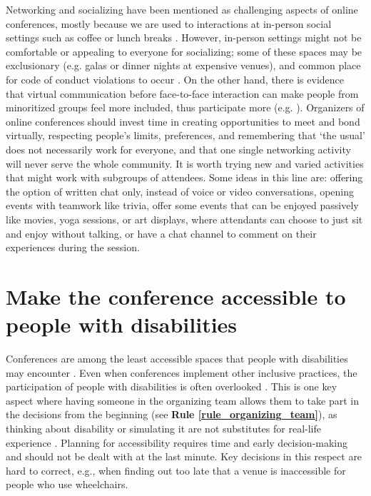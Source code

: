 \documentclass[10pt,letterpaper]{article}
\begin{document}
Networking and socializing have been mentioned as challenging aspects of online conferences, mostly because we are used to interactions at in-person social settings such as coffee or lunch breaks \cite{salibaGettingGripsOnline2020, roosOnlineConferencesNew2020}. 
However, in-person settings might not be comfortable or appealing to everyone for socializing; 
some of these spaces may be exclusionary (e.g. galas or dinner nights at expensive venues), and common place for code of conduct violations to occur \cite{auroraHowRespondCode2019}. 
On the other hand, there is evidence that virtual communication before face-to-face interaction can make people from minoritized groups feel more included, thus participate more (e.g. \cite{trianaDoesOrderFacetoFace2012, blackEngenderingBelongingThoughtful2020}). 
Organizers of online conferences should invest time in creating opportunities to meet and bond virtually, respecting people's limits, preferences, and remembering that `the usual' does not necessarily work for everyone, and that one single networking activity will never serve the whole community. 
It is worth trying new and varied activities that might work with subgroups of attendees.
Some ideas in this line are: offering the option of written chat only, instead of voice or video conversations, opening events with teamwork like trivia, offer some events that can be enjoyed passively like movies, yoga sessions, or art displays, where attendants can choose to just sit and enjoy without talking, or have a chat channel to comment on their experiences during the session.


\section{Make the conference accessible to people with disabilities}
\label{rule_accessibility}


Conferences are among the least accessible spaces that people with disabilities may encounter \cite{priceAccessImaginedConstruction2009}. Even when conferences implement other inclusive practices, the participation of people with disabilities is often overlooked \cite{marks2021meeting}. This is one key aspect where having someone in the organizing team allows them to take part in the decisions from the beginning (see \textbf{Rule \ref{rule_organizing_team}}), as thinking about disability or simulating it are not substitutes for real-life experience \cite{costanzachockDesign2020}. Planning for accessibility requires time and early decision-making \cite{irishIncreasingParticipationUsing2020} and should not be dealt with at the last minute. Key decisions in this respect are hard to correct, e.g., when finding out too late that a venue is inaccessible for people who use wheelchairs. 
\end{document}

